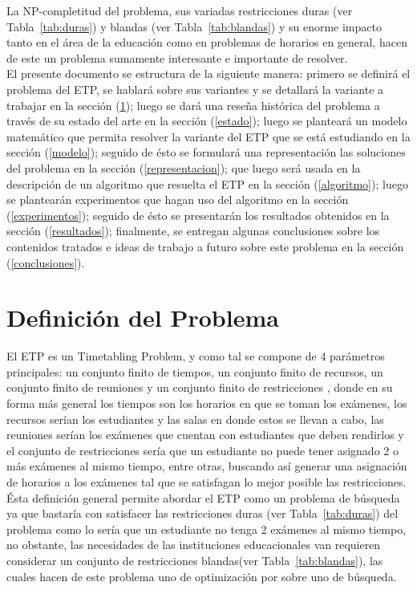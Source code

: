 \documentclass[letter, 10pt]{article}
\begin{document}
La NP-completitud del problema, sus variadas restricciones duras (ver Tabla~\ref{tab:duras}) y blandas (ver Tabla~\ref{tab:blandas}) y su enorme impacto tanto en el área de la educación como en problemas de horarios en general, hacen de este un problema sumamente interesante e importante de resolver.\\ 

El presente documento se estructura de la siguiente manera: primero se definirá el problema del ETP, se hablará sobre sus variantes y se detallará la variante a trabajar en la sección (\ref{definicion}); luego se dará una reseña histórica del problema a través de su estado del arte en la sección (\ref{estado}); luego se planteará un modelo matemático que permita resolver la variante del ETP que se está estudiando en la sección (\ref{modelo}); seguido de ésto se formulará una representación las soluciones del problema en la sección (\ref{representacion}); que luego será usada en la descripción de un algoritmo que resuelta el ETP en la sección (\ref{algoritmo}); luego se plantearán experimentos que hagan uso del algoritmo en la sección (\ref{experimentos}); seguido de ésto se presentarán los resultados obtenidos en la sección (\ref{resultados}); finalmente, se entregan algunas conclusiones sobre los contenidos tratados e ideas de trabajo a futuro sobre este problema en la sección (\ref{conclusiones}).

\section{Definición del Problema} \label{definicion}

El ETP es un Timetabling Problem, y como tal se compone de 4 parámetros principales: un conjunto finito de tiempos, un conjunto finito de recursos, un conjunto finito de reuniones y un conjunto finito de restricciones \cite{Qu2009}, donde en su forma más general los tiempos son los horarios en que se toman los exámenes, los recursos serían los estudiantes y las salas en donde estos se llevan a cabo, las reuniones serían los exámenes que cuentan con estudiantes que deben rendirlos y el conjunto de restricciones sería que un estudiante no puede tener asignado 2 o más exámenes al mismo tiempo, entre otras, buscando así generar una asignación de horarios a los exámenes tal que se satisfagan lo mejor posible las restricciones. Ésta definición general permite abordar el ETP como un problema de búsqueda ya que bastaría con satisfacer las restricciones duras (ver Tabla~\ref{tab:duras}) del problema como lo sería que un estudiante no tenga 2 exámenes al mismo tiempo, no obstante, las necesidades de las instituciones educacionales van requieren considerar un conjunto de restricciones blandas(ver Tabla~\ref{tab:blandas}), las cuales hacen de este problema uno de optimización por sobre uno de búsqueda.\\
\end{document}
